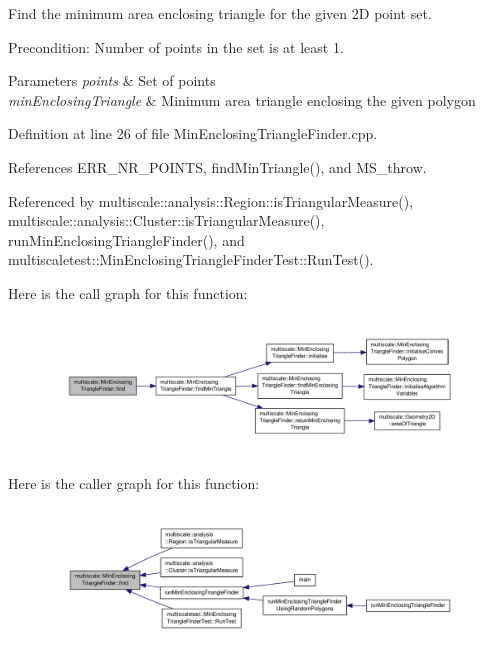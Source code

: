 Find the minimum area enclosing triangle for the given 2\-D point set. 

Precondition\-: Number of points in the set is at least 1.


\begin{DoxyParams}{Parameters}
{\em points} & Set of points \\
\hline
{\em min\-Enclosing\-Triangle} & Minimum area triangle enclosing the given polygon \\
\hline
\end{DoxyParams}


Definition at line 26 of file Min\-Enclosing\-Triangle\-Finder.\-cpp.



References E\-R\-R\-\_\-\-N\-R\-\_\-\-P\-O\-I\-N\-T\-S, find\-Min\-Triangle(), and M\-S\-\_\-throw.



Referenced by multiscale\-::analysis\-::\-Region\-::is\-Triangular\-Measure(), multiscale\-::analysis\-::\-Cluster\-::is\-Triangular\-Measure(), run\-Min\-Enclosing\-Triangle\-Finder(), and multiscaletest\-::\-Min\-Enclosing\-Triangle\-Finder\-Test\-::\-Run\-Test().



Here is the call graph for this function\-:\nopagebreak
\begin{figure}[H]
\begin{center}
\leavevmode
\includegraphics[width=350pt]{classmultiscale_1_1MinEnclosingTriangleFinder_afe74965c39261feb7152f5556c0281cd_cgraph}
\end{center}
\end{figure}




Here is the caller graph for this function\-:\nopagebreak
\begin{figure}[H]
\begin{center}
\leavevmode
\includegraphics[width=350pt]{classmultiscale_1_1MinEnclosingTriangleFinder_afe74965c39261feb7152f5556c0281cd_icgraph}
\end{center}
\end{figure}


